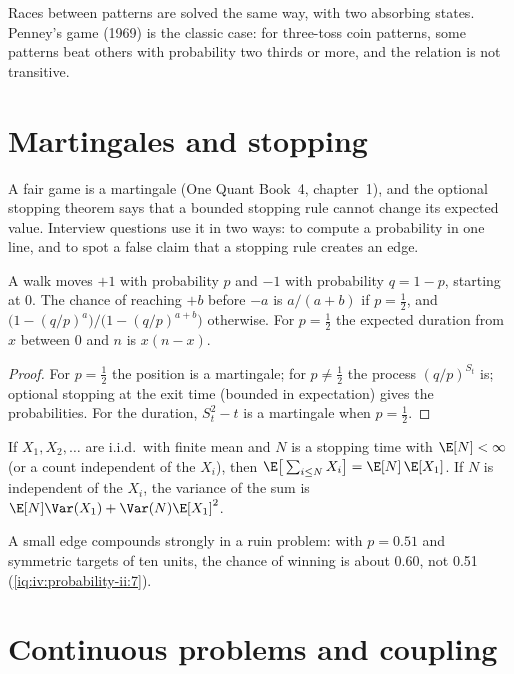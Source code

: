 Races between patterns are solved the same way, with two absorbing states. Penney's game (1969) is the classic
case: for three-toss coin patterns, some patterns beat others with probability two thirds or more, and the
relation is not transitive.

\section{Martingales and stopping}

A fair game is a martingale (One Quant Book~4, chapter~1), and the optional stopping theorem says that a bounded
stopping rule cannot change its expected value. Interview questions use it in two ways: to compute a probability
in one line, and to spot a false claim that a stopping rule creates an edge.

\begin{proposition}\label{prop:iv:probability-ii:ruin}
A walk moves $+1$ with probability $p$ and $-1$ with probability $q = 1 - p$, starting at 0. The chance of reaching
$+b$ before $-a$ is $a/(a+b)$ if $p = \tfrac12$, and $\big(1 - (q/p)^a\big)/\big(1 - (q/p)^{a+b}\big)$ otherwise.
For $p = \tfrac12$ the expected duration from $x$ between 0 and $n$ is $x(n - x)$.
\end{proposition}

\begin{proof}
For $p = \tfrac12$ the position is a martingale; for $p \neq \tfrac12$ the process $(q/p)^{S_t}$ is; optional
stopping at the exit time (bounded in expectation) gives the probabilities. For the duration, $S_t^2 - t$ is a
martingale when $p = \tfrac12$.
\end{proof}

\begin{proposition}\label{prop:iv:probability-ii:wald}
If $X_1, X_2, \dots$ are i.i.d.\ with finite mean and $N$ is a stopping time with $\E[N] < \infty$ (or a count
independent of the $X_i$), then $\E\big[\sum_{i \le N} X_i\big] = \E[N]\,\E[X_1]$. If $N$ is independent of the
$X_i$, the variance of the sum is $\E[N]\Var(X_1) + \Var(N)\E[X_1]^2$.
\end{proposition}

A small edge compounds strongly in a ruin problem: with $p = 0.51$ and symmetric targets of ten units, the
chance of winning is about 0.60, not 0.51 (\cref{iq:iv:probability-ii:7}).

\section{Continuous problems and coupling}


